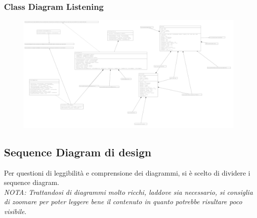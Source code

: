 \documentclass{article}
\begin{document}
		\subsubsection{Class Diagram Listening}
		\begin{figure}[H]
			\centering
			\includegraphics[width=1.0\textwidth]{Immagini/classdiagramdesignlistening}
		\end{figure}
		\newpage
		\subsection{Sequence Diagram di design}
		Per questioni di leggibilità e comprensione dei diagrammi, si è scelto di dividere i sequence diagram.\\
		\textit{NOTA: Trattandosi di diagrammi molto ricchi, laddove sia necessario, si consiglia di zoomare per poter leggere bene il contenuto in quanto potrebbe risultare poco visibile}.
\end{document}
